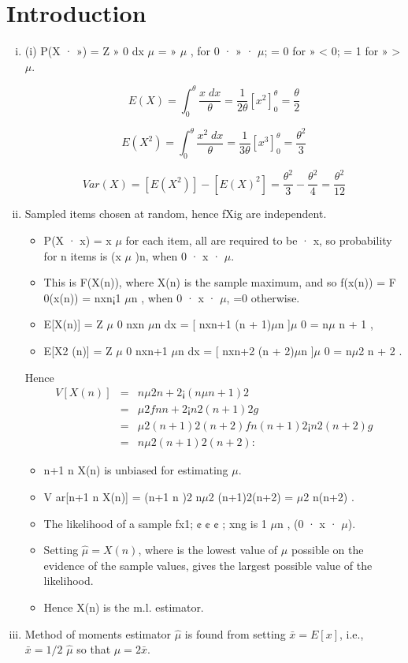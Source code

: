 \documentclass[a4paper,12pt]{article}
\begin{document}
\section{Introduction}
\begin{enumerate}[(i)]
\item (i) P(X · ») =
Z »
0
dx
$\mu$
= »
$\mu$
, for 0 · » · $\mu$; = 0 for » < 0; = 1 for » > $\mu$.

\[E(X) = \int^{\theta}_{0} \frac{x\;dx}{\theta} = \frac{1}{2\theta}\left[ x^2 \right]^{\theta}_{0} = \frac{\theta}{2}\]



\[E(X^2) = \int^{\theta}_{0} \frac{x^2\;dx}{\theta} = \frac{1}{3\theta}\left[ x^3 \right]^{\theta}_{0} = \frac{\theta^2}{3}\]

\[ Var(X) = [E(X^2)] - [E(X)^2] = \frac{\theta^2}{3} - \frac{\theta^2}{4} = \frac{\theta^2}{12}\]
\item Sampled items chosen at random, hence fXig are independent. 
\begin{itemize}
\item P(X · x) =
x
$\mu$ for each item, all are required to be · x, so probability for n items is (x
$\mu$ )n,
when 0 · x · $\mu$. 
\item This is F(X(n)), where X(n) is the sample maximum, and
so f(x(n)) = F
0(x(n)) = nxn¡1
$\mu$n , when 0 · x · $\mu$, =0 otherwise.
\item E[X(n)] =
Z $\mu$
0
nxn
$\mu$n dx = [ nxn+1
(n + 1)$\mu$n ]$\mu$
0 = n$\mu$
n + 1
,
\item E[X2
(n)] =
Z $\mu$
0
nxn+1
$\mu$n dx = [ nxn+2
(n + 2)$\mu$n ]$\mu$
0 = n$\mu$2
n + 2
.

\end{itemize}
Hence
\begin{eqnarray*}
V [X(n)] &=& n\mu2
n+2 ¡ ( n\mu
n+1)2\\ &=& \mu2f n
n+2 ¡ n2
(n+1)2 g\\
&=& \mu2
(n+1)2(n+2)fn(n + 1)2 ¡ n2(n + 2)g \\ &=& 
n \mu 2
(n+1)2(n+2) :
\end{eqnarray*}

\begin{itemize}
\item n+1
n X(n) is unbiased for estimating $\mu$.
\item V ar[n+1
n X(n)] = (n+1
n )2 n$\mu$2
(n+1)2(n+2) = $\mu$2
n(n+2) .
\item The likelihood of a sample fx1; ¢ ¢ ¢ ; xng is 1
$\mu$n , (0 · x · $\mu$).
\item Setting $\hat{\mu} = X(n)$, where is the lowest value of $\mu$ possible on the evidence of
the sample values, gives the largest possible value of the likelihood.
\item  Hence X(n) is the m.l. estimator.
\end{itemize}
\item Method of moments estimator $\hat{\mu}$ is found from setting $\bar{x} = E[x]$, i.e., $\bar{x} = 1/2$
$\hat{\mu}$
so that $\hat{\mu} = 2\bar{x}$. 


\end{enumerate}
\end{document}
